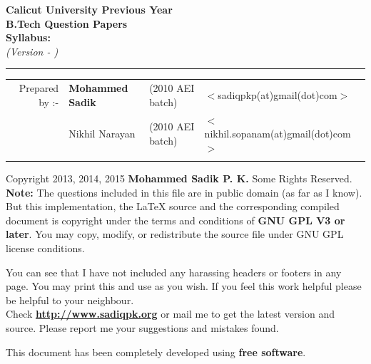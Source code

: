 \begin{center}
  {\huge  \textbf{Calicut University Previous Year \\B.Tech Question Papers}}\\\textbf{\syllabus{} Syllabus: \year }\\
  \emph{{\large (Version \version{} - \updated)}}\\


\end{center}





\vspace{5 mm}


\hrule\vspace{7 mm}

\hspace{2 mm}\begin{tabular}{r@{ } l@{} l@{} l@{}}
  Prepared by :-& \textbf{Mohammed Sadik} & (2010 AEI batch) & $<$sadiqpkp(at)gmail(dot)com$>$\\
  & Nikhil Narayan & (2010 AEI batch) & $<$nikhil.sopanam(at)gmail(dot)com$>$\\\\


\end{tabular}


Copyright \textcopyright{} 2013, 2014, 2015 \textbf{Mohammed Sadik P. K.} Some Rights Reserved.\\

\noindent \textbf{Note:} The questions included in this file are in public domain (as far as I know).
But this implementation, the \LaTeX{} source and the corresponding compiled document is copyright
under the terms and conditions of \textbf{GNU GPL V3 or later}. You may copy, modify, or 
redistribute the source file under GNU GPL license conditions.


You can see that I have not included any harassing headers or footers in any page. You may print this and use as you wish.
If you feel this work helpful please be helpful to your neighbour.\\ 


Check \textbf{\href{http://www.sadiqpk.org}{http://www.sadiqpk.org}} or mail me  to get the latest version and source. Please report me your suggestions and mistakes found.
\newpage



This document has been completely developed using \textbf{free software}. \\

